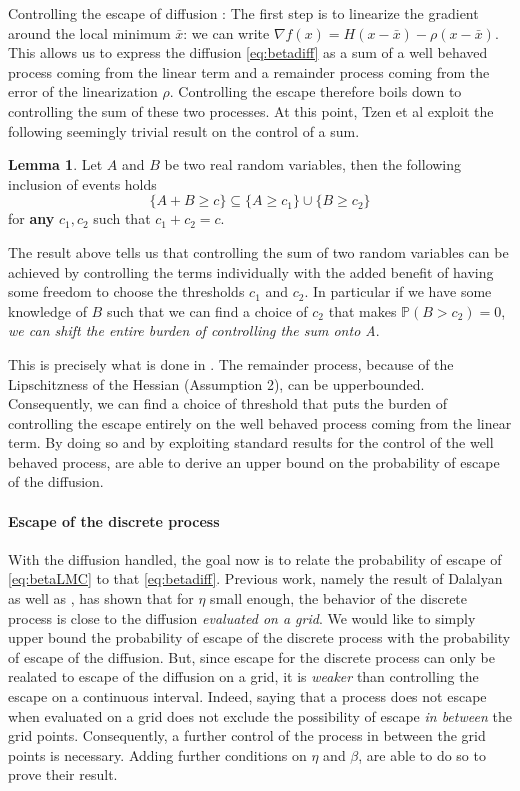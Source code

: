 \documentclass[10pt,journal,a4paper]{IEEEtran}
\theoremstyle{definition}
\newtheorem{lemma}[theorem]{Lemma}
\newcommand{\Prb}{\mathbb{P}}
\begin{document}
\begin{paragraph}{Controlling the escape of diffusion :} The first step is to linearize the gradient around the local minimum $\bar{x}$: we can write $\nabla f(x) = H(x-\bar{x}) - \rho(x - \bar{x})$. This allows us to express the diffusion \eqref{eq:betadiff} as a sum of a well behaved process coming from the linear term and a remainder process coming from the error of the linearization $\rho$. Controlling the escape therefore boils down to controlling the sum of these two processes. At this point, Tzen et al exploit the following seemingly trivial result on the control of a sum.
\begin{lemma}
Let $A$ and $B$ be two real random variables, then the following inclusion of events holds 
\[
\{A + B \geq c \} \subseteq  \{A \geq c_1\} \cup \{ B \geq c_2\}
\]
for \textbf{any} $c_1, c_2$ such that $c_1 + c_2 = c$. 
\end{lemma}

The result above tells us that controlling the sum of two random variables can be achieved by controlling the terms individually with the added benefit of having some freedom to choose the thresholds $c_1$ and $c_2$. In particular if we have some knowledge of $B$ such that we can find a choice of $c_2$ that makes $\Prb(B > c_2) = 0$, \textit{we can shift the entire burden of controlling the sum onto A}.

This is precisely what is done in \cite{tzen_local_2018}. The remainder process, because of the Lipschitzness of the Hessian (Assumption 2), can be upperbounded. Consequently, we can find a choice of threshold that puts the burden of controlling the escape entirely on the well behaved process coming from the linear term. By doing so and by exploiting standard results for the control of the well behaved process, \cite{tzen_local_2018} are able to derive an upper bound on the probability of escape of the diffusion. 
\end{paragraph}

\paragraph{Escape of the discrete process} With the diffusion handled, the goal now is to relate the probability of escape of \eqref{eq:betaLMC} to that \eqref{eq:betadiff}. Previous work, namely the result of Dalalyan \cite{dalalyan_theoretical_2016} as well as \cite{raginsky_non-convex_2017}, has shown that for $\eta$ small enough, the behavior of the discrete process is close to the diffusion \textit{evaluated on a grid}. We would like to simply upper bound the probability of escape of the discrete process with the probability of escape of the diffusion. But, since escape for the discrete process can only be realated to escape of the diffusion on a grid, it is \emph{weaker} than controlling the escape on a continuous interval. Indeed, saying that a process does not escape when evaluated on a grid does not exclude the possibility of escape \emph{in between} the grid points. Consequently, a further control of the process in between the grid points is necessary. Adding further conditions on $\eta$ and $\beta$, \cite{tzen_local_2018} are able to do so to prove their result.
\end{document}
